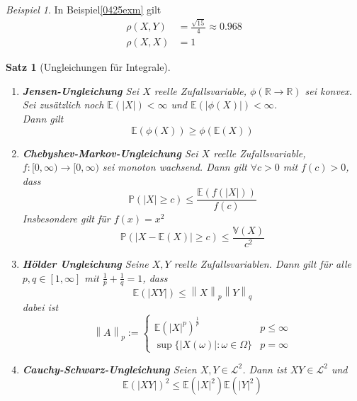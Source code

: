 \documentclass[10pt,a4paper]{article}
\newcommand{\R}{\ensuremath{\mathbb{R}}}
\newcommand{\norm}[1]{\left\|#1\right\|}
\newcommand{\Prb}{\mathbb P}
\newcommand{\Epv}{\ensuremath{\mathbb{E}}}
\newcommand{\Var}{\mathbb{V}}
\newcommand{\Kor}{\rho}
\newcommand{\scL}{\mathscr L}
\theoremstyle{plain}
\newtheorem{satz}[theorem]{Satz}
\theoremstyle{definition}
\theoremstyle{remark}
\newtheorem{exm}[theorem]{Beispiel}
\begin{document}
	\begin{exm}
		In Beispiel\ref{0425exm} gilt
		\begin{align*}
		\Kor(X,Y)&=\frac{\sqrt{15}}{4}\approx0.968\\
		\Kor(X,X)&=1
		\end{align*}
	\end{exm}

	\begin{satz}[Ungleichungen für Integrale]\label{0428intUngl}
		\begin{enumerate}
			\item \textbf{Jensen-Ungleichung} Sei $X$ reelle Zufallsvariable, $\phi(\R\to\R)$ sei konvex.\\
			Sei zusätzlich noch $\Epv(|X|)<\infty$ und $\Epv(|\phi(X)|)<\infty$.\\
			Dann gilt
			\[\Epv(\phi(X))\geq \phi(\Epv(X))\]
			
			\setcounter{enumi}{3}
			\item \label{chebyshev-markov}
			\textbf{Chebyshev-Markov-Ungleichung} Sei $X$ reelle Zufallsvariable, $f:[0,\infty)\to[0,\infty)$ sei monoton wachsend. Dann gilt $\forall c>0$ mit $f(c)>0$, dass\[\Prb(|X|\geq c)\leq\frac{\Epv(f(|X|))}{f(c)}\]
			Insbesondere gilt für $f(x)=x^2$
			\[\Prb(|X-\Epv(X)|\geq c)\leq\frac{\Var(X)}{c^2}\]
			
			\setcounter{enumi}{1}
			\item\textbf{Hölder Ungleichung} Seine $X,Y$ reelle Zufallsvariablen. Dann gilt für alle $p,q\in[1,\infty]$ mit $\frac{1}{p}+\frac{1}{q}=1$, dass
			\[\Epv(|XY|)\leq\norm{X}_p\norm{Y}_q\]
			dabei ist 
			\[\norm{A}_p:=\begin{cases}
			\Epv(|X|^p)^\frac{1}{p}&p\leq \infty\\
			\sup\{|X(\omega)|:\omega\in\Omega\}&p=\infty
			\end{cases}\]
			\item\textbf{Cauchy-Schwarz-Ungleichung} Seien $X,Y\in\scL^2$. Dann ist $XY\in\scL^2$ und\[\Epv(|XY|)^2\leq\Epv(|X|^2)\Epv(|Y|^2)\]
			
		\end{enumerate}
	\end{satz}
\end{document}
